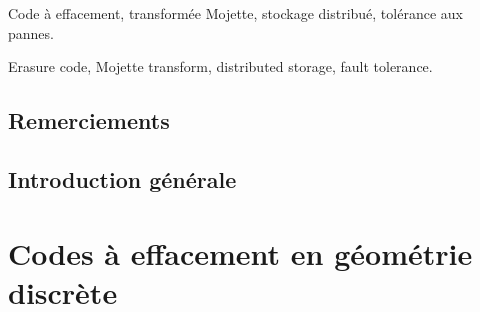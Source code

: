 \begin{resume}
    \footnotesize
    
\end{resume}

\begin{motscles}
    Code à effacement, transformée Mojette, stockage distribué,
    tolérance aux pannes.
\end{motscles}

\begin{abstract}
    \footnotesize
    
\end{abstract}

\begin{keywords}
    Erasure code, Mojette transform, distributed storage, fault tolerance.
\end{keywords}

\maketitle

\chapter*{Remerciements}



\dominitoc
\tableofcontents

\newrefsegment

\chapter*{Introduction générale}



%

\part{Codes à effacement en géométrie discrète}


%


%


%


%

